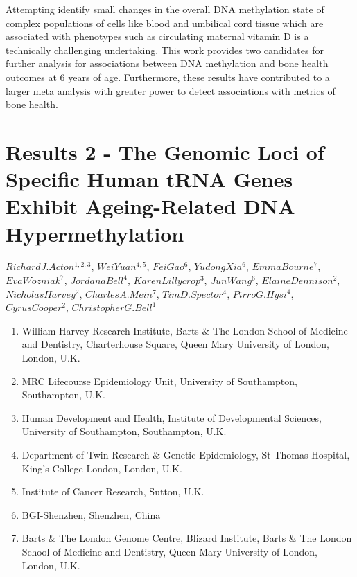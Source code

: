 \documentclass[
]{book}
\providecommand{\tightlist}{%
  \setlength{\itemsep}{0pt}\setlength{\parskip}{0pt}}
\begin{document}
Attempting identify small changes in the overall DNA methylation state of complex populations of cells like blood and umbilical cord tissue which are associated with phenotypes such as circulating maternal vitamin D is a technically challenging undertaking.
This work provides two candidates for further analysis for associations between DNA methylation and bone health outcomes at 6 years of age.
Furthermore, these results have contributed to a larger meta analysis with greater power to detect associations with metrics of bone health.

\hypertarget{tRNAs}{%
\chapter{Results 2 - The Genomic Loci of Specific Human tRNA Genes Exhibit Ageing-Related DNA Hypermethylation}\label{tRNAs}}

\(Richard J. Acton ^{1,2,3}\), \(Wei Yuan ^{4,5}\), \(Fei Gao ^{6}\), \(Yudong Xia ^{6}\), \(Emma Bourne ^{7}\), \(Eva Wozniak ^{7}\), \(Jordana Bell ^{4}\), \(Karen Lillycrop ^{3}\), \(Jun Wang ^{6}\), \(Elaine Dennison ^{2}\), \(Nicholas Harvey ^{2}\), \(Charles A. Mein ^{7}\), \(Tim D. Spector ^{4}\), \(Pirro G. Hysi ^{4}\), \(Cyrus Cooper ^{2}\), \(Christopher G. Bell ^{1}\)

\begin{enumerate}
\def\labelenumi{\arabic{enumi}.}
\tightlist
\item
  William Harvey Research Institute, Barts \& The London School of Medicine and Dentistry, Charterhouse Square, Queen Mary University of London, London, U.K.
\item
  MRC Lifecourse Epidemiology Unit, University of Southampton, Southampton, U.K.
\item
  Human Development and Health, Institute of Developmental Sciences, University of Southampton, Southampton, U.K.\\
\item
  Department of Twin Research \& Genetic Epidemiology, St Thomas Hospital, King's College London, London, U.K.
\item
  Institute of Cancer Research, Sutton, U.K.
\item
  BGI-Shenzhen, Shenzhen, China
\item
  Barts \& The London Genome Centre, Blizard Institute, Barts \& The London School of Medicine and Dentistry, Queen Mary University of London, London, U.K.
\end{enumerate}
\end{document}
